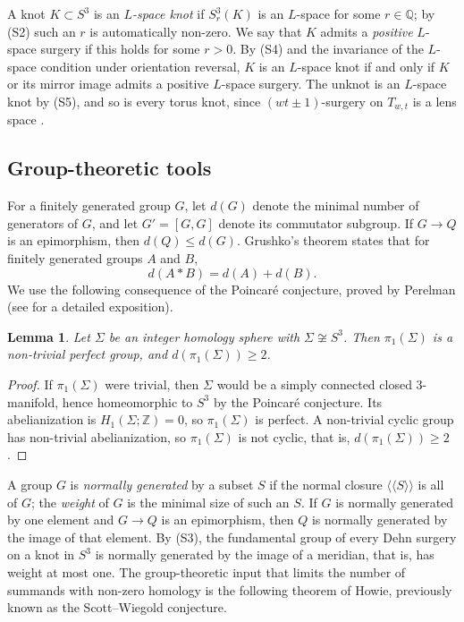 \documentclass[12pt]{article}
\newcommand{\Z}{\mathbb Z}
\newcommand{\Q}{\mathbb Q}
\newcommand{\Surg}[2]{S^3_{#1}(#2)}
\newcommand{\rk}{d}
\newtheorem{lemma}[theorem]{Lemma}
\theoremstyle{definition}
\theoremstyle{remark}
\begin{document}
A knot \(K\subset S^3\) is an \emph{\(L\)-space knot} if \(\Surg{r}{K}\)
is an \(L\)-space for some \(r\in\Q\); by (S2) such an \(r\) is
automatically non-zero. We say that \(K\) admits a \emph{positive}
\(L\)-space surgery if this holds for some \(r>0\). By (S4) and the
invariance of the \(L\)-space condition under orientation reversal,
\(K\) is an \(L\)-space knot if and only if \(K\) or its mirror image
admits a positive \(L\)-space surgery. The unknot is an \(L\)-space knot
by (S5), and so is every torus knot, since \((wt\pm1)\)-surgery on
\(T_{w,t}\) is a lens space \cite{Moser1971}.

\subsection{Group-theoretic tools}\label{sec:groups}

For a finitely generated group \(G\), let \(\rk(G)\) denote the minimal
number of generators of \(G\), and let \(G'=[G,G]\) denote its commutator
subgroup. If \(G\to Q\) is an epimorphism, then \(\rk(Q)\leq\rk(G)\).
Grushko's theorem \cite{Grushko1940} states that for finitely generated
groups \(A\) and \(B\),
\begin{equation}\label{eq:grushko}
 \rk(A*B)=\rk(A)+\rk(B).
\end{equation}
We use the following consequence of the Poincar\'e conjecture, proved
by Perelman (see \cite{MorganTian2007} for a detailed exposition).

\begin{lemma}\label{lem:perfect}
Let \(\Sigma\) be an integer homology sphere with \(\Sigma\not\cong S^3\).
Then \(\pi_1(\Sigma)\) is a non-trivial perfect group, and
\(\rk(\pi_1(\Sigma))\geq2\).
\end{lemma}

\begin{proof}
If \(\pi_1(\Sigma)\) were trivial, then \(\Sigma\) would be a simply
connected closed \(3\)-manifold, hence homeomorphic to \(S^3\) by the
Poincar\'e conjecture. Its abelianization is
\(H_1(\Sigma;\Z)=0\), so \(\pi_1(\Sigma)\) is perfect. A non-trivial
cyclic group has non-trivial abelianization, so \(\pi_1(\Sigma)\) is not
cyclic, that is, \(\rk(\pi_1(\Sigma))\geq2\).
\end{proof}

A group \(G\) is \emph{normally generated} by a subset \(S\) if the
normal closure \(\langle\!\langle S\rangle\!\rangle\) is all of \(G\); the
\emph{weight} of \(G\) is the minimal size of such an \(S\). If \(G\) is
normally generated by one element and \(G\to Q\) is an epimorphism, then
\(Q\) is normally generated by the image of that element. By (S3), the
fundamental group of every Dehn surgery on a knot in \(S^3\) is normally
generated by the image of a meridian, that is, has weight at most one.
The group-theoretic input that limits the number of summands with
non-zero homology is the following theorem of Howie, previously known as
the Scott--Wiegold conjecture.
\end{document}
